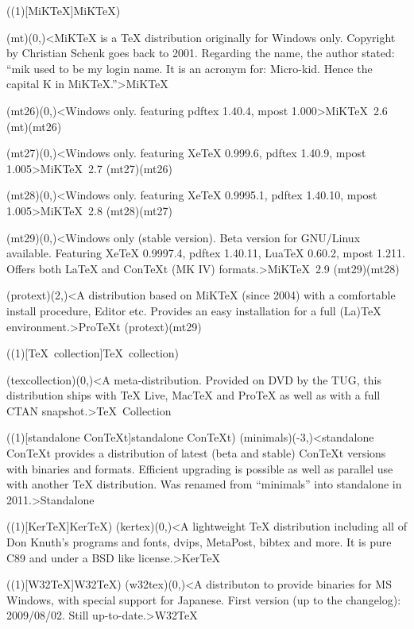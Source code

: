 \tograph(\tostruct(1)[MiK\TeX]{MiK\TeX}){
	\tonode(mt)(0,\layer)<MiKTeX is a TeX distribution originally for Windows only. Copyright by Christian Schenk goes back to 2001. Regarding the name, the author stated: “mik used to be my login name. It is an acronym for: Micro-kid. Hence the capital K in MiKTeX.”>{MiK\TeX}
	\steplayer

	\tonode(mt26)(0,\layer)<Windows only. featuring  pdftex 1.40.4, mpost 1.000>{MiK\TeX\ 2.6}
	\todraw(mt)(mt26)
	\steplayer

	\tonode(mt27)(0,\layer)<Windows only. featuring  XeTeX 0.999.6, pdftex 1.40.9, mpost 1.005>{MiK\TeX\ 2.7}
	\todraw(mt27)(mt26)
	\steplayer

	\tonode(mt28)(0,\layer)<Windows only. featuring  XeTeX 0.9995.1, pdftex 1.40.10, mpost 1.005>{MiK\TeX\ 2.8}
	\todraw(mt28)(mt27)
	\steplayer

	\tonode(mt29)(0,\layer)<Windows only (stable version). Beta version for GNU/Linux available. Featuring XeTeX 0.9997.4, pdftex 1.40.11, LuaTeX 0.60.2, mpost 1.211. Offers both LaTeX and ConTeXt (MK IV) formats.>{MiK\TeX\ 2.9}
	\todraw(mt29)(mt28)
	\steplayer	
	
	\tonode(protext)(2,\layer)<A distribution based on MiKTeX (since 2004) with a comfortable install procedure, Editor etc. Provides an easy installation for a full (La)TeX environment.>{ProTeXt}
	\todraw(protext)(mt29)
}

\tograph(\tostruct(1)[\TeX\ collection]{\TeX\ collection}){
	\tonode(texcollection)(0,\layer)<A meta-distribution. Provided on DVD by the TUG, this distribution ships with TeX Live, MacTeX and ProTeX as well as with a full CTAN snapshot.>{\TeX\ Collection}

}

\tograph(\tostruct(1)[standalone Con\TeX t]{standalone Con\TeX t}){
	\tonode(minimals)(-3,\layer)<standalone ConTeXt provides a distribution of latest (beta and stable) ConTeXt versions with binaries and formats. Efficient upgrading is possible as well as parallel use with another TeX distribution. Was renamed from “minimals” into standalone in 2011.>{Standalone}
}

\tograph(\tostruct(1)[Ker\TeX]{Ker\TeX}){
	\tonode(kertex)(0,\layer)<A lightweight TeX distribution including all of Don Knuth's programs and fonts, dvips, MetaPost, bibtex and more. It is pure C89 and under a BSD like license.>{Ker\TeX}
}

\tograph(\tostruct(1)[W32\TeX]{W32\TeX}){
	\tonode(w32tex)(0,\layer)<A distributon to provide binaries for MS Windows, with special support for Japanese. First version (up to the changelog): 2009/08/02. Still up-to-date.>{W32\TeX}
}

